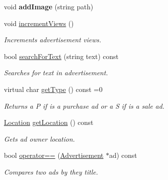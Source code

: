 \begin{DoxyCompactItemize}
\item 
\hypertarget{class_advertisement_a3925f5b2411ae7ac00a56f3398ae9353}{}void {\bfseries add\+Image} (string path)\label{class_advertisement_a3925f5b2411ae7ac00a56f3398ae9353}

\item 
\hypertarget{class_advertisement_abd20373813b956bac9a6fd78a4947ebc}{}void \hyperlink{class_advertisement_abd20373813b956bac9a6fd78a4947ebc}{increment\+Views} ()\label{class_advertisement_abd20373813b956bac9a6fd78a4947ebc}

\begin{DoxyCompactList}\small\item\em Increments advertisement views. \end{DoxyCompactList}\item 
bool \hyperlink{class_advertisement_a883fc4cf6525ed95001f5c21c8a4d2ff}{search\+For\+Text} (string text) const 
\begin{DoxyCompactList}\small\item\em Searches for text in advertisement. \end{DoxyCompactList}\item 
virtual char \hyperlink{class_advertisement_acb3174a830215ed6dfd922002f2c8924}{get\+Type} () const  =0
\begin{DoxyCompactList}\small\item\em Returns a P if is a purchase ad or a S if is a sale ad. \end{DoxyCompactList}\item 
\hyperlink{class_location}{Location} \hyperlink{class_advertisement_a353ac42132683f145b64cf00cd9bdf40}{get\+Location} () const 
\begin{DoxyCompactList}\small\item\em Gets ad owner location. \end{DoxyCompactList}\item 
bool \hyperlink{class_advertisement_a72e7b7fe8f2d1070fa2682d268e39567}{operator==} (\hyperlink{class_advertisement}{Advertisement} $\ast$ad) const 
\begin{DoxyCompactList}\small\item\em Compares two ads by they title. \end{DoxyCompactList}\end{DoxyCompactItemize}
